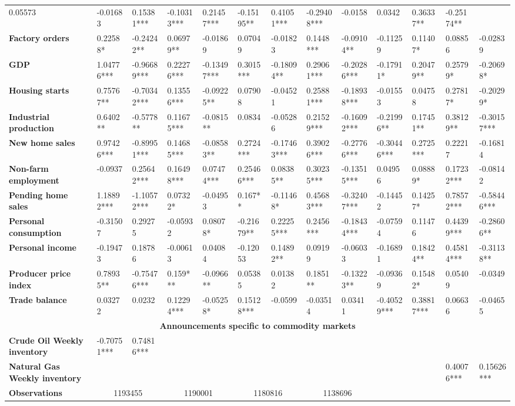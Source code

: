 \begin{sidewaystable}
{\begin{tabular}{@{}lllllllllllll@{}}
0.05573 & -0.01683 & 0.15381*** & -0.10313*** & 0.21457*** & -0.15195** & 0.41051*** & -0.29408*** & -0.0158 & 0.0342 & 0.36337** & -0.25174** \\ \textbf{Factory orders}& 0.22588* & -0.24242** & 0.06979** & -0.01869 & 0.07049 & -0.01823 & 0.1448*** & -0.09104** & -0.11259 & 0.11407* & 0.08856 & -0.02839 \\ \textbf{GDP}& 1.04776*** & -0.96689*** & 0.22276*** & -0.13497*** & 0.3015*** & -0.18094** & 0.29061*** & -0.20286*** & -0.17911* & 0.20479** & 0.25799* & -0.20698* \\ \textbf{Housing starts}& 0.75767** & -0.70342*** & 0.13556*** & -0.09225** & 0.07908 & -0.04521 & 0.25881*** & -0.18938*** & -0.01553 & 0.04758 & 0.27817* & -0.20299* \\ \textbf{Industrial production}& 0.6402** & -0.5778** & 0.11675*** & -0.0815** & 0.0834 & -0.05286 & 0.21529*** & -0.16092*** & -0.21996** & 0.17451** & 0.38129** & -0.30157*** \\ \textbf{New home sales}& 0.97426*** & -0.89951*** & 0.14685*** & -0.08583** & 0.2724*** & -0.17463*** & 0.39026*** & -0.27766*** & -0.30446*** & 0.2725*** & 0.22217 & -0.16814 \\ \textbf{Non-farm employment}& -0.0937 & 0.25642*** & 0.16498*** & 0.07474*** & 0.25466*** & 0.08385** & 0.30235*** & -0.13515*** & 0.04956 & 0.08889* & 0.17232*** & -0.08142 \\ \textbf{Pending home sales}& 1.18892*** & -1.10572*** & 0.07322* & -0.04953 & 0.167** & -0.11468* & 0.45683*** & -0.32407*** & -0.14452 & 0.14257* & 0.78572*** & -0.58446*** \\ \textbf{Personal consumption}& -0.31507 & 0.29275 & -0.05932 & 0.08078* & -0.21679** & 0.22255*** & 0.2456*** & -0.18434*** & -0.07594 & 0.11476 & 0.44399*** & -0.28606** \\ \textbf{Personal income}& -0.19473 & 0.18786 & -0.00613 & 0.04084 & -0.12053 & 0.14892** & 0.09199 & -0.06033 & -0.16891 & 0.18424** & 0.45814*** & -0.31138** \\ \textbf{Producer price index}& 0.78935** & -0.75476*** & 0.159*** & -0.0966** & 0.05385 & 0.01382 & 0.1851** & -0.13223** & -0.09369 & 0.15482* & 0.05409 & -0.0349 \\ \textbf{Trade balance}& 0.03272 & 0.0232 & 0.12294*** & -0.05258* & 0.15128*** & -0.0599 & -0.03514 & 0.03411 & -0.40529*** & 0.38817*** & 0.06636 & -0.04655 \\  \midrule \multicolumn{13}{c}{\textbf{Announcements specific to commodity markets}} \\ \midrule \textbf{Crude Oil Weekly inventory}& -0.70751*** & 0.74816*** &  &  &  &  &  &  &  &  &  &  \\ \textbf{Natural Gas Weekly inventory}&  &  &  &  &  &  &  &  &  &  & 0.40076*** & 0.15626*** \\  \midrule \textbf{Observations}             &\multicolumn{2}{c}{ 1193455 }                                                 & \multicolumn{2}{c}{ 1190001 }                                                 & \multicolumn{2}{c}{ 1180816 }                                                 & \multicolumn{2}{c}{ 1138696 }                                             
\end{tabular}}
\end{sidewaystable}
